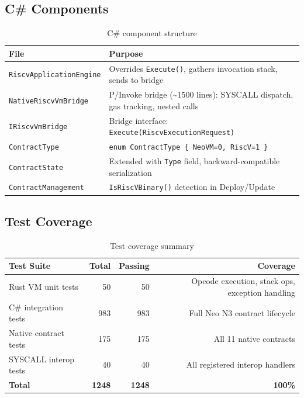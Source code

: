 \documentclass[11pt,a4paper]{article}
\begin{document}
\subsection{C\# Components}

\begin{table}[H]
\centering
\begin{tabular}{lp{8.5cm}}
\toprule
\textbf{File} & \textbf{Purpose} \\
\midrule
\texttt{RiscvApplicationEngine} & Overrides \texttt{Execute()}, gathers invocation stack, sends to bridge \\
\texttt{NativeRiscvVmBridge} & P/Invoke bridge (\textasciitilde1500 lines): SYSCALL dispatch, gas tracking, nested calls \\
\texttt{IRiscvVmBridge} & Bridge interface: \texttt{Execute(RiscvExecutionRequest)} \\
\texttt{ContractType} & \texttt{enum ContractType \{ NeoVM=0, RiscV=1 \}} \\
\texttt{ContractState} & Extended with \texttt{Type} field, backward-compatible serialization \\
\texttt{ContractManagement} & \texttt{IsRiscVBinary()} detection in Deploy/Update \\
\bottomrule
\end{tabular}
\caption{C\# component structure}
\end{table}

\subsection{Test Coverage}

\begin{table}[H]
\centering
\begin{tabular}{lrrr}
\toprule
\textbf{Test Suite} & \textbf{Total} & \textbf{Passing} & \textbf{Coverage} \\
\midrule
Rust VM unit tests          &   50 &   50 & Opcode execution, stack ops, exception handling \\
C\# integration tests       &  983 &  983 & Full Neo N3 contract lifecycle \\
Native contract tests       &  175 &  175 & All 11 native contracts \\
SYSCALL interop tests       &   40 &   40 & All registered interop handlers \\
\midrule
\textbf{Total}              & \textbf{1248} & \textbf{1248} & \textbf{100\%} \\
\bottomrule
\end{tabular}
\caption{Test coverage summary}
\end{table}
\end{document}
